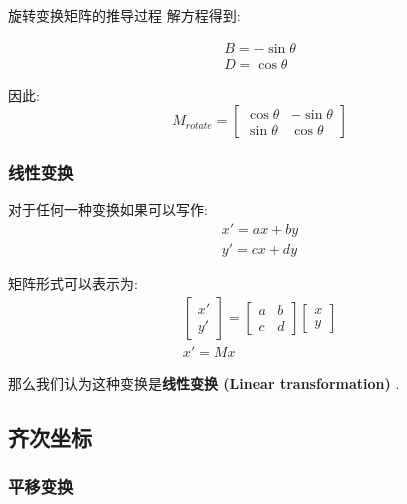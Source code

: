 \documentclass[openany]{progbookcn}
\begin{document}
\begin{titledbox}{旋转变换矩阵的推导过程}
解方程得到: 

\begin{equation}
	\begin{split}
		B=-\sin\theta\\D=\cos\theta
	\end{split}
\end{equation}

因此: 
\begin{equation}
	M_{rotate}=\begin{bmatrix}\cos\theta&-\sin\theta\\\sin\theta&\cos\theta\end{bmatrix}
\end{equation}

\end{titledbox}

\subsubsection{线性变换}

对于任何一种变换如果可以写作: 
\begin{equation}
	\begin{split}
		x'=ax+by\\y'=cx+dy
	\end{split}
\end{equation}

矩阵形式可以表示为: 
\begin{equation}
	\begin{split}
	\begin{bmatrix}x'\\y'\end{bmatrix}=\begin{bmatrix}a&b\\c&d\end{bmatrix}\begin{bmatrix}x\\y\end{bmatrix}
	\\
	x'=Mx
	\end{split}
\end{equation}

那么我们认为这种变换是\textbf{线性变换 (Linear transformation) }. 

\subsection{齐次坐标}

\subsubsection{平移变换}
\end{document}
